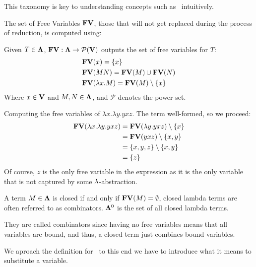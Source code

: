 \begin{remark}
  This taxonomy is key to understanding concepts such as \aequiv \ intuitively.
\end{remark}
The set of Free Variables $\mathbf{FV}$, those that will not get replaced during the process of reduction, is computed using:
\begin{definition} Given $T \in \mathbf{\Lambda} $, $\mathbf{FV} : \mathbf{\Lambda} \to \mathcal{P}(\mathbf{V}) $ outputs the set of free variables for $T$:
  \begin{align*}
    & \mathbf{FV}(x) = \{x\}\\
    & \mathbf{FV}(MN) = \mathbf{FV}(M) \cup \mathbf{FV}(N) \\
    & \mathbf{FV}(\lambda x . M) = \mathbf{FV}(M) \setminus \{x\}
  \end{align*}
  Where $ x \in \mathbf{V} $ and $ M, N \in \mathbf{\Lambda} $, and $\mathcal{P}$ denotes the power set.

\end{definition}
\begin{example} Computing the free variables of $\lambda x . \lambda y . y x z$. The term well-formed, so we proceed:
  \begin{align*}
    \mathbf{FV}(\lambda x . \lambda y . y x z) &= \mathbf{FV}(\lambda y . yxz) \setminus \{x\} \\
                                        &= \mathbf{FV}(yxz) \setminus \{x, y\} \\
                                        &= \{x, y, z\} \setminus \{x, y\} \\
                                        &= \{z\}
  \end{align*}
  Of course, $z$ is the only free variable in the expression as it is the only variable that is not captured by some $\lambda$-abstraction.
\end{example}
\begin{definition}
  A term $M \in \mathbf{\Lambda}$ is closed if and only if $\mathbf{FV}(M) = \emptyset$, closed lambda terms are often referred to as combinators. $\mathbf{\Lambda}^0$ is the set of all closed lambda terms.
\end{definition}
\begin{note} They are called combinators since having no free variables means that all variables are bound, and thus, a closed term just combines bound variables.
\end{note}

We aproach the definition for \aequiv \, to this end we have to introduce what it means to substitute a variable.

